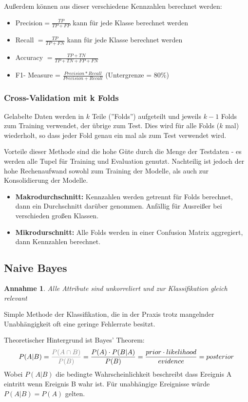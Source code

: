 \documentclass{article}
\newtheorem{assumption}{Annahme}
\begin{document}
Außerdem können aus dieser verschiedene Kennzahlen berechnet werden:
\begin{itemize}
    \item  Precision$ = \frac{TP}{TP+FP} $ kann für jede Klasse berechnet werden
    \item  Recall $= \frac{TP}{TP+FN} $ kann für jede Klasse berechnet werden
    \item  Accuracy $=  \frac{TP+TN}{TP+TN+FP+FN} $
    \item  F1- Measure = $ \frac{Precision * Recall}{Precision + Recall} $ (Untergrenze = 80\%)
\end{itemize}

\subsubsection{Cross-Validation mit k Folds}
Gelabelte Daten werden in $k$ Teile (''Folds'') aufgeteilt und jeweils $k-1$ Folds zum Training verwendet,
der übrige zum Test. Dies wird für alle Folds ($k$ mal) wiederholt, so dass jeder Fold genau ein mal als zum Test verwendet wird.

Vorteile dieser Methode sind die hohe Güte durch die Menge der Testdaten - 
es werden alle Tupel für Training und Evaluation genutzt.
Nachteilig ist jedoch der hohe Rechenaufwand sowohl zum Training der Modelle,
als auch zur Konsolidierung der Modelle.

\begin{itemize}
    \item \textbf{Makrodurchschnitt:} Kennzahlen werden getrennt für Folds berechnet, 
    dann ein Durchschnitt darüber genommen. Anfällig für Ausreißer bei verschieden großen Klassen.
    \item \textbf{Mikrodurschnitt:} Alle Folds werden in einer Confusion Matrix aggregiert, dann Kennzahlen berechnet.
\end{itemize}


\subsection{Naive Bayes}
\begin{assumption}
Alle Attribute sind unkorreliert und zur Klassifikation gleich relevant
\end{assumption}

Simple Methode der Klassifikation, die in der Praxis trotz mangelnder Unabhängigkeit oft eine geringe Fehlerrate besitzt.

Theoretischer Hintergrund ist Bayes' Theorem:
\[ P(A | B) 
= \textcolor{gray}{\frac{P(A \cap B)}{P(B)}}
= \frac{P(A)\cdot P(B | A) }{P(B)} 
= \frac{prior \cdot likelihood}{evidence}
= posterior\]
Wobei $P(A | B)$ die bedingte Wahrscheinlichkeit beschreibt dass Ereignis A eintritt wenn Ereignis B wahr ist.
Für unabhängige Ereignisse würde $P(A|B) = P(A)$ gelten.
\end{document}
